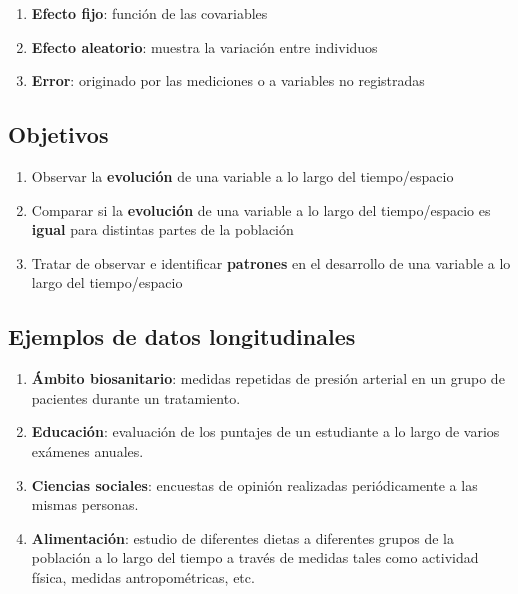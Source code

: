 \documentclass[
  letterpaper,
  DIV=11,
  numbers=noendperiod]{scrreprt}
\providecommand{\tightlist}{%
  \setlength{\itemsep}{0pt}\setlength{\parskip}{0pt}}\usepackage{longtable,booktabs,array}
\begin{document}
\begin{enumerate}
\def\labelenumi{\arabic{enumi}.}
\tightlist
\item
  \textbf{Efecto fijo}: función de las covariables
\item
  \textbf{Efecto aleatorio}: muestra la variación entre individuos
\item
  \textbf{Error}: originado por las mediciones o a variables no
  registradas
\end{enumerate}

\subsection{Objetivos}\label{objetivos}

\begin{enumerate}
\def\labelenumi{\arabic{enumi}.}
\tightlist
\item
  Observar la \textbf{evolución} de una variable a lo largo del
  tiempo/espacio
\item
  Comparar si la \textbf{evolución} de una variable a lo largo del
  tiempo/espacio es \textbf{igual} para distintas partes de la población
\item
  Tratar de observar e identificar \textbf{patrones} en el desarrollo de
  una variable a lo largo del tiempo/espacio
\end{enumerate}

\subsection{Ejemplos de datos
longitudinales}\label{ejemplos-de-datos-longitudinales}

\begin{enumerate}
\def\labelenumi{\arabic{enumi}.}
\tightlist
\item
  \textbf{Ámbito biosanitario}: medidas repetidas de presión arterial en
  un grupo de pacientes durante un tratamiento.
\item
  \textbf{Educación}: evaluación de los puntajes de un estudiante a lo
  largo de varios exámenes anuales.
\item
  \textbf{Ciencias sociales}: encuestas de opinión realizadas
  periódicamente a las mismas personas.
\item
  \textbf{Alimentación}: estudio de diferentes dietas a diferentes
  grupos de la población a lo largo del tiempo a través de medidas tales
  como actividad física, medidas antropométricas, etc.
\end{enumerate}
\end{document}

